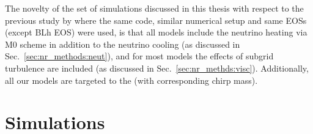 
%


The novelty of the set of simulations discussed in this thesis with respect to the 
previous study by \citet{Radice:2018pdn} where the same code,
similar numerical setup 
and same \acp{EOS} (except BLh \ac{EOS}) were used, 
is that all models include the neutrino heating via 
M0 scheme in addition to the neutrino cooling 
(as discussed in Sec.~\ref{sec:nr_methods:neut}), 
and for most models the effects of subgrid turbulence  
are included (as discussed in Sec.~\ref{sec:nr_methds:visc}). 
Additionally, all our models are targeted to the \GW{} 
(with corresponding chirp mass).



\section{Simulations}\label{sec:bns_merg:sims}




